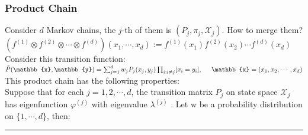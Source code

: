 \documentclass{beamer}
\begin{document}
\begin{frame}[t]
  \scriptsize
  \frametitle{Product Chain}
  Consider $d$ Markov chains, the $j$-th of them is $(P_j, \pi_j, \mathcal{X}_j)$. How to merge them? \\
  {\centering $(f^{(1)}\otimes f^{(2)}\otimes\cdots\otimes f^{(d)})(x_1, \cdots,  x_d) := f^{(1)}(x_1)f^{(2)}(x_2)\cdots f^{(d)}(x_d)$\\}
  Consider this transition function: \\
  {\centering $\tilde{P}(\mathbb{x}, \mathbb{y}) = \sum_{j=1}^d w_jP_j(x_j, y_j) \prod_{i:i\not=j}[x_i = y_i], \hspace{0.5cm}\mathbb{x} = (x_1, x_2, \cdots, x_d)$ \\}
  This product chain has the following properties: \\
  Suppose that for each $j = 1, 2, \cdots , d$, the transition matrix $P_j$
  on state space $\mathcal{X}_j$ has eigenfunction $\varphi^{(j)}$ with eigenvalue $\lambda^{(j)}$ .
  Let w be a probability distribution on $\{1, \cdots , d\}$, then: \\
  \vspace{1mm}
  \hrule
  \vspace{1mm}
\end{frame}
\end{document}
